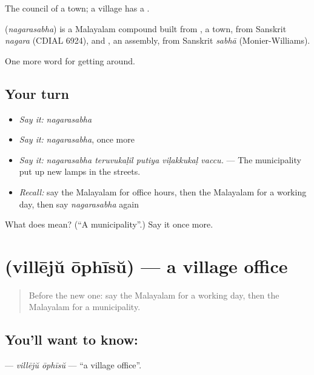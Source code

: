 The council of a town; a village has a .

\begin{cousinweb}
\textbf{} (\emph{nagarasabha}) is a Malayalam compound built from , a town, from Sanskrit \emph{nagara} (CDIAL 6924), and , an assembly, from Sanskrit \emph{sabhā} (Monier-Williams).
\end{cousinweb}

\begin{grammarlens}[title={What you've built}]
One more word for getting around.
\end{grammarlens}

\subsection*{Your turn}
\begin{itemize}
\raggedright
  \item \emph{Say it:} \emph{nagarasabha}
  \item \emph{Say it:} \emph{nagarasabha}, once more
  \item \emph{Say it:} \emph{nagarasabha teruvukaḷil putiya viḷakkukaḷ vaccu.} — The municipality put up new lamps in the streets.
  \item \emph{Recall:} say the Malayalam for office hours, then the Malayalam for a working day, then say \emph{nagarasabha} again
\end{itemize}

\begin{tcolorbox}[breakable,colback=teal!4,colframe=teal!35!black,title={Before you move on}]
What does  mean? (\textquotedblleft{}A municipality\textquotedblright{}.) Say it once more.
\end{tcolorbox}
\section[\texorpdfstring{\ml{വില്ലേജ്} \ml{ഓഫീസ്} (villējŭ ōphīsŭ)}{വില്ലേജ് ഓഫീസ് (villējŭ ōphīsŭ)}]{  (villējŭ ōphīsŭ) — a village office}

\label{lesson:ML-C487-villeju-ophisu}



\begin{quote}
Before the new one: say the Malayalam for a working day, then the Malayalam for a municipality.
\end{quote}

\subsection*{You'll want to know:  }
\textbf{ } — \emph{villējŭ ōphīsŭ} — \textquotedblleft{}a village office\textquotedblright{}.

